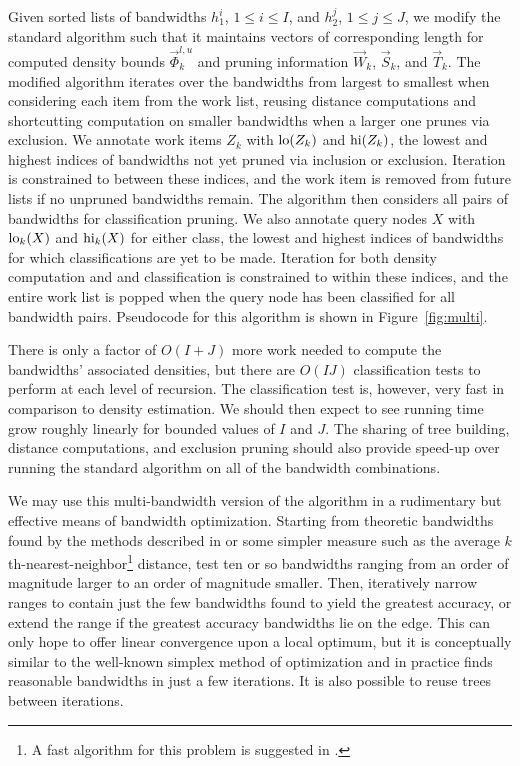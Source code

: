 \documentclass[twoside,leqno,twocolumn]{article}
\newcommand{\lohi}[1]{#1^{l,u}}
\begin{document}
Given sorted lists of bandwidths $h_1^i$, $1 \leq i \leq I$, and
$h_2^j$, $1 \leq j \leq J$, we modify the standard algorithm such that
it maintains vectors of corresponding length for computed density
bounds $\lohi{\vec{\Phi}_k}$ and pruning information $\vec{W}_k$,
$\vec{S}_k$, and $\vec{T}_k$.  The modified algorithm iterates over
the bandwidths from largest to smallest when considering each item
from the work list, reusing distance computations and shortcutting
computation on smaller bandwidths when a larger one prunes via
exclusion.  We annotate work items $Z_k$ with ${\rm lo}(Z_k)$ and
${\rm hi}(Z_k)$, the lowest and highest indices of bandwidths not yet
pruned via inclusion or exclusion.  Iteration is constrained to
between these indices, and the work item is removed from future lists
if no unpruned bandwidths remain.  The algorithm then considers all
pairs of bandwidths for classification pruning. We also annotate query
nodes $X$ with ${\rm lo}_k(X)$ and ${\rm hi}_k(X)$ for either class,
the lowest and highest indices of bandwidths for which classifications
are yet to be made.  Iteration for both density computation and and
classification is constrained to within these indices, and the entire
work list is popped when the query node has been classified for all
bandwidth pairs.  Pseudocode for this algorithm is shown in
Figure~\ref{fig:multi}.

There is only a factor of $O(I + J)$ more work needed to compute the
bandwidths' associated densities, but there are $O(IJ)$ classification
tests to perform at each level of recursion.  The classification test
is, however, very fast in comparison to density estimation.  We should
then expect to see running time grow roughly linearly for bounded
values of $I$ and $J$.  The sharing of tree building, distance
computations, and exclusion pruning should also provide speed-up over
running the standard algorithm on all of the bandwidth combinations.

We may use this multi-bandwidth version of the algorithm in a
rudimentary but effective means of bandwidth optimization.  Starting
from theoretic bandwidths found by the methods described in
\cite{silverman86} or some simpler measure such as the average
$k$th-nearest-neighbor\footnote{A fast algorithm for this problem is
suggested in \cite{nips2000paper}.} distance, test ten or so
bandwidths ranging from an order of magnitude larger to an order of
magnitude smaller.  Then, iteratively narrow ranges to contain just
the few bandwidths found to yield the greatest accuracy, or extend the
range if the greatest accuracy bandwidths lie on the edge.  This can
only hope to offer linear convergence upon a local optimum, but it is
conceptually similar to the well-known simplex method of optimization
and in practice finds reasonable bandwidths in just a few iterations.
It is also possible to reuse trees between iterations.
\end{document}
